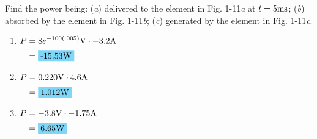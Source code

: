 Find the power being: (\emph{a}) delivered to the element in Fig. 1-11\emph{a} at $t=5\qw{\ms}$; (\emph{b}) absorbed by the element in Fig. 1-11\emph{b}; (\emph{c}) generated by the element in Fig. 1-11\emph{c}.

\begin{enumerate}[leftmargin=2cm,labelsep=.5cm,label=\bfseries\alph*)]
	\item $
	\begin{aligned}[t]
	P &= 8e^{-100(.005)}\qw{\V} \cdot -3.2\qw{\A}\\
	&= \hlbox{-15.53\qw{\watt}} \\
	\end{aligned} $
	\\[1cm]
	
	\item $
	\begin{aligned}[t]
	P &= 0.220\qw{\V} \cdot 4.6\qw{\A}\\
	&= \hlbox{1.012\qw{\watt}} \\
	\end{aligned} $
	\\[1cm]
	
	\item $
	\begin{aligned}[t]
	P &= -3.8\qw{\V} \cdot -1.75\qw{\A}\\
	&= \hlbox{6.65\qw{\watt}} \\
	\end{aligned} $
	\\[1cm]
\end{enumerate}